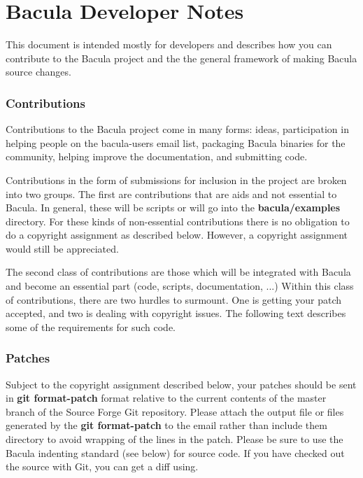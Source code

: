 
\chapter{Bacula Developer Notes}
\label{_ChapterStart10}

This document is intended mostly for developers and describes how you can
contribute to the Bacula project and the the general framework of making
Bacula source changes.

\subsection{Contributions}

Contributions to the Bacula project come in many forms: ideas,
participation in helping people on the bacula-users email list, packaging
Bacula binaries for the community, helping improve the documentation, and
submitting code.

Contributions in the form of submissions for inclusion in the project are
broken into two groups.  The first are contributions that are aids and not
essential to Bacula.  In general, these will be scripts or will go into the
{\bf bacula/examples} directory.  For these kinds of non-essential
contributions there is no obligation to do a copyright assignment as
described below.  However, a copyright assignment would still be
appreciated.

The second class of contributions are those which will be integrated with
Bacula and become an essential part (code, scripts, documentation, ...)
Within this class of contributions, there are two hurdles to surmount.  One
is getting your patch accepted, and two is dealing with copyright issues.
The following text describes some of the requirements for such code.

\subsection{Patches}

Subject to the copyright assignment described below, your patches should be
sent in {\bf git format-patch} format relative to the current contents of the
master branch of the Source Forge Git repository.  Please attach the
output file or files generated by the {\bf git format-patch} to the email
rather than include them directory to avoid wrapping of the lines
in the patch.  Please be sure to use the Bacula
indenting standard (see below) for source code.  If you have checked out
the source with Git, you can get a diff using.

